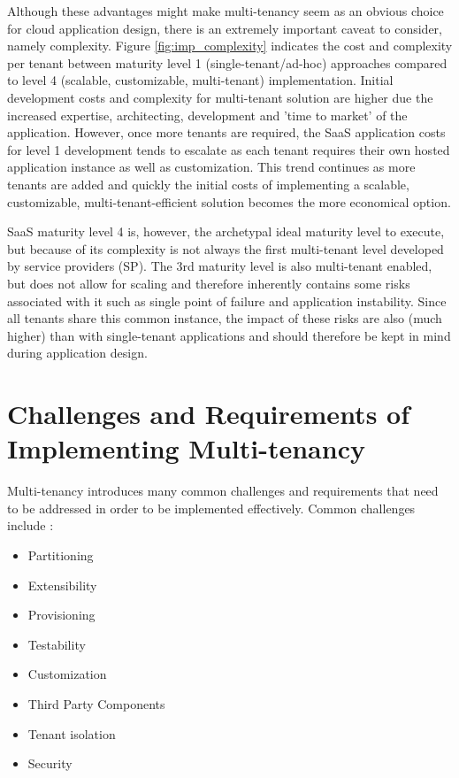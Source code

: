 Although these advantages might make multi-tenancy seem as an obvious choice for cloud application design, there is an extremely important caveat to consider, namely complexity. Figure \ref{fig:imp_complexity} indicates the cost and complexity per tenant between maturity level 1 (single-tenant/ad-hoc) approaches compared to level 4 (scalable, customizable, multi-tenant) implementation. Initial development costs and complexity for multi-tenant solution are higher due the increased expertise, architecting, development and 'time to market' of the application. However, once more tenants are required, the SaaS application costs for level 1 development tends to escalate as each tenant requires their own hosted application instance as well as customization. This trend continues as more tenants are added and quickly the initial costs of implementing a scalable, customizable, multi-tenant-efficient solution becomes the more economical option.



SaaS maturity level 4 is, however, the archetypal ideal maturity level to execute, but because of its complexity is not always the first multi-tenant level developed by service providers (SP). The 3rd maturity level is also multi-tenant enabled, but does not allow for scaling and therefore inherently contains some risks associated with it such as single point of failure and application instability. Since all tenants share this common instance, the impact of these risks are also (much higher) than with single-tenant applications and should therefore be kept in mind during application design.

\section{Challenges and Requirements of Implementing Multi-tenancy}

Multi-tenancy introduces many common challenges and requirements that need to be addressed in order to be implemented effectively. Common challenges include \cite{Betts2012-ad}:

\begin{itemize}
\item Partitioning
\item Extensibility
\item Provisioning
\item Testability
\item Customization
\item Third Party Components
\item Tenant isolation
\item Security
\end{itemize}


